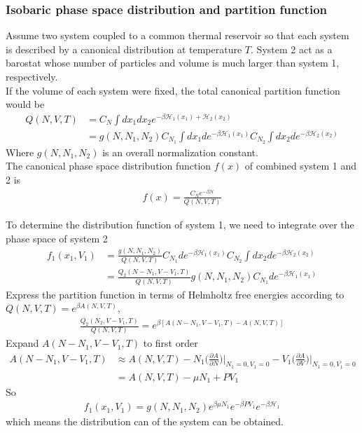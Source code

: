 \documentclass{beamer}
\begin{document}
\begin{frame}
\frametitle{Isobaric phase space distribution and partition function}
\fontsize{9pt}{10pt}\selectfont
Assume two system coupled to a common thermal reservoir so that each system is described by a canonical distribution at temperature $T$. System 2 act as a barostat whose number of particles and volume is much larger than system 1, respectively.\\
If the volume of each system were fixed, the total canonical partition function would be
\begin{align}
Q(N,V,T)&=C_N\int dx_1dx_2e^{-\beta\mathscr{H}_1(x_1)+\mathscr{H}_2(x_2)}\nonumber\\
&=g(N,N_1,N_2)C_{N_1}\int dx_1de^{-\beta\mathscr{H}_1(x_1)}C_{N_2}\int dx_2de^{-\beta\mathscr{H}_2(x_2)}
\end{align}
Where $g(N,N_1,N_2)$ is an overall  normalization constant.\\
The canonical phase space distribution function $f(x)$  of combined system 1 and 2 is
\begin{align}
f(x)=\frac{C_Ne^{-\beta\mathscr{H}}}{Q(N,V,T)}
\end{align}
\end{frame}
\begin{frame}
\fontsize{9pt}{10pt}\selectfont
To determine the distribution function of system 1, we need to integrate over the phase space of system 2
\begin{align}
f_1(x_1,V_1)&=\frac{g(N,N_1,N_2)}{Q(N,V,T)}C_{N_1}de^{-\beta\mathscr{H}_1(x_1)}C_{N_2}\int dx_2de^{-\beta\mathscr{H}_2(x_2)}\nonumber\\
&=\frac{Q_2(N-N_1,V-V_1,T)}{Q(N,V,T)}g(N,N_1,N_2)C_{N_1}de^{-\beta\mathscr{H}_1(x_1)}
\end{align}
Express the partition function in terms of Helmholtz free energies according to $Q(N,V,T)=e^{\beta A(N,V,T)}$,
\begin{align}
\frac{Q_2(N_2,V-V_1,T)}{Q(N,V,T)}=e^{\beta [A(N-N_1,V-V_1,T)-A(N,V,T)]}
\end{align}
Expand $A(N-N_1,V-V_1,T)$ to first order
\begin{align}
A(N-N_1,V-V_1,T)&\approx A(N,V,T)-N_1\Big(\frac{\partial A}{\partial N}\Big)\Big|_{N_1=0,V_1=0}-V_1\Big(\frac{\partial A}{\partial V}\Big)\Big|_{N_1=0,V_1=0}\nonumber\\
&=A(N,V,T)-\mu N_1+PV_1
\end{align}
So
\begin{align}
f_1(x_1,V_1)=g(N,N_1,N_2)e^{\beta\mu N_1}e^{-\beta PV_1}e^{-\beta\mathscr{H}_1}
\end{align}
which means the distribution can of the system can be obtained.
\end{frame}
\end{document}
